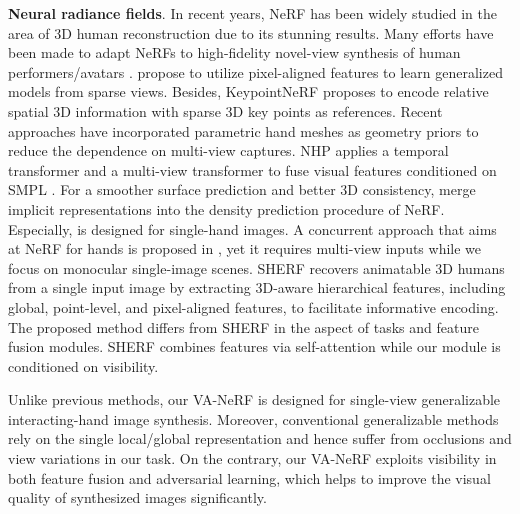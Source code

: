 \documentclass[letterpaper]{article} %
\begin{document}
\textbf{Neural radiance fields}.
In recent years, NeRF \cite{mildenhall2021nerf} has been widely studied in the area of 3D human reconstruction due to its stunning results. Many efforts have been made to adapt NeRFs to high-fidelity novel-view synthesis of human performers/avatars \cite{deng2022depth,mildenhall2022nerf,johari2022geonerf,niemeyer2022regnerf, Johari_2022_CVPR,martin2021nerf}. \cite{raj2021pixel,wang2021ibrnet,yu2021pixelnerf} propose to utilize pixel-aligned features to learn generalized models from sparse views. Besides, KeypointNeRF \cite{mihajlovic2022keypointnerf} proposes to encode relative spatial 3D information with sparse 3D key points as references. Recent approaches \cite{peng2021neural,kwon2021neural} have incorporated parametric hand meshes as geometry priors to reduce the dependence on multi-view captures. NHP \cite{kwon2021neural} applies a temporal transformer and a multi-view transformer to fuse visual features conditioned on SMPL \cite{loper2015smpl}. For a smoother surface prediction and better 3D consistency, \cite{or2022stylesdf,hong2022eva3d,corona2022lisa} merge implicit representations into the density prediction procedure of NeRF. Especially, \cite{corona2022lisa} is designed for single-hand images. A concurrent approach that aims at NeRF for hands is proposed in \cite{guo2023handnerf}, yet it requires multi-view inputs while we focus on monocular single-image scenes. SHERF \cite{hu2023sherf} recovers animatable 3D humans from a single input image by extracting 3D-aware hierarchical features, including global, point-level, and pixel-aligned features, to facilitate informative encoding. The proposed method differs from SHERF in the aspect of tasks and feature fusion modules. SHERF combines features via self-attention while our module is conditioned on visibility.

Unlike previous methods, our VA-NeRF is designed for single-view generalizable interacting-hand image synthesis. Moreover, conventional generalizable methods rely on the single local/global representation and hence suffer from occlusions and view variations in our task. On the contrary, our VA-NeRF exploits visibility in both feature fusion and adversarial learning, which helps to improve the visual quality of synthesized images significantly.
\end{document}
